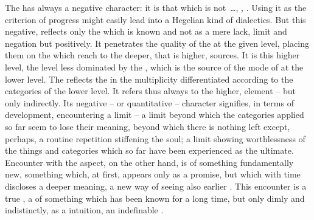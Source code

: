 \noindent
The  has always a negative character: it is that which is
not~\ldots \herenow, , .  Using it as the criterion of progress
might easily lead into a Hegelian kind of dialectics.  But this negative,
 reflects only the  which is known and
 not as a mere lack, limit and negation but positively. It
penetrates the quality of the  at the given level, placing them
on the  which reach to the deeper, that is higher, sources.  It is
this higher level, the level less dominated by the , which is the
source of the mode of  at the lower level.  The
 reflects the  in the multiplicity
differentiated according to the categories of the lower level. It refers thus
always to the higher,  element -- but only indirectly. Its negative
-- or quantitative -- character signifies, in terms of 
development, encountering a limit -- a limit beyond which the categories applied
so far seem to lose their meaning, beyond which there is nothing left except,
perhaps, a routine repetition stiffening the soul; a limit showing worthlessness
of the things and categories which so far have been experienced as the ultimate.
Encounter with the  aspect, on the other hand, is  of something fundamentally new, something which, at first, appears
only as a  promise, but which with time discloses a deeper meaning, a
new way of seeing also earlier .  This encounter is a true
, a  of something which has been known for a
long time, but only dimly and indistinctly, as a  intuition, an
indefinable .

